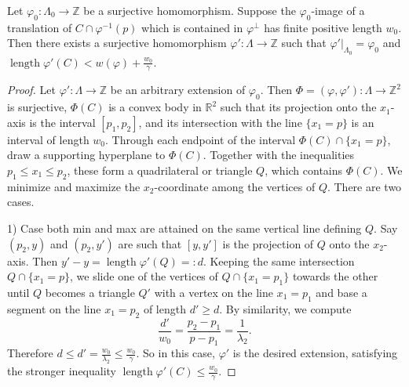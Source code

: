\documentclass[10pt,a4paper]{amsart}
\newcommand{\R}{{\mathbb R}}
\newcommand{\Z}{{\mathbb Z}}
\newcommand{\length}{\operatorname{length}}
\begin{document}
\begin{prop}\label{lfb}
	Let $\varphi_0\colon \Lambda_0\to \Z$ be a surjective homomorphism.
	Suppose the $\varphi_0$-image of a translation of $C \cap\varphi^{-1}(p)$ which is contained in $\varphi^\perp$
	has finite positive length $w_0$. Then there exists
	a surjective homomorphism $\varphi'\colon \Lambda\to \Z$ such that $\varphi'|_{\Lambda_0}=\varphi_0$
	and 
	$
	\length \varphi'(C)<w(\varphi)+\frac{w_0}{\gamma}.
	$
\end{prop}

\begin{proof}
	Let $\varphi'\colon \Lambda\to \Z$ be an arbitrary extension of $\varphi_0$. Then 
	$\Phi=(\varphi,\varphi')\colon \Lambda\to \Z^2$ is surjective, $\Phi(C)$ is
	a convex body in $\R^2$ such that its projection onto the $x_1$-axis is the interval $[p_1,p_2]$, and its intersection with the line $\{x_1=p\}$ is an interval of length $w_0$. Through each endpoint of the interval $\Phi(C)\cap \{x_1=p\}$, draw a supporting hyperplane to $\Phi(C)$. Together with the inequalities $p_1 \le x_1 
	\le p_2$, these form a quadrilateral or triangle $Q$, which contains $\Phi(C)$. We minimize and maximize the $x_2$-coordinate among the vertices of $Q$. There are two cases.
	
	1) Case both min and max are attained on the same vertical line defining $Q$. Say $(p_2,y)$ and $(p_2,y')$ are such that $[y,y']$ is the projection of $Q$ onto the $x_2$-axis. Then $y'-y=\length  \varphi'(Q)=:d$. Keeping the same intersection $Q\cap \{x_1=p\}$, we slide one of the vertices of $Q\cap\{x_1=p_1\}$ towards the other until $Q$ becomes a triangle $Q'$ with a vertex on the line $x_1=p_1$ and base a segment on the line $x_1=p_2$ of length $d'\ge d$. By similarity, we compute
	$$
	\frac{d'}{w_0}=\frac{p_2-p_1}{p-p_1}=\frac{1}{\lambda_2}.
	$$
	Therefore $d\le d'=\frac{w_0}{\lambda_2}\le \frac{w_0}{\gamma}$. So in this case, $\varphi'$ is the desired extension, satisfying the stronger inequality 
	$
	\length \varphi'(C) \le \frac{w_0}{\gamma}.
	$
	

\end{proof}
\end{document}
